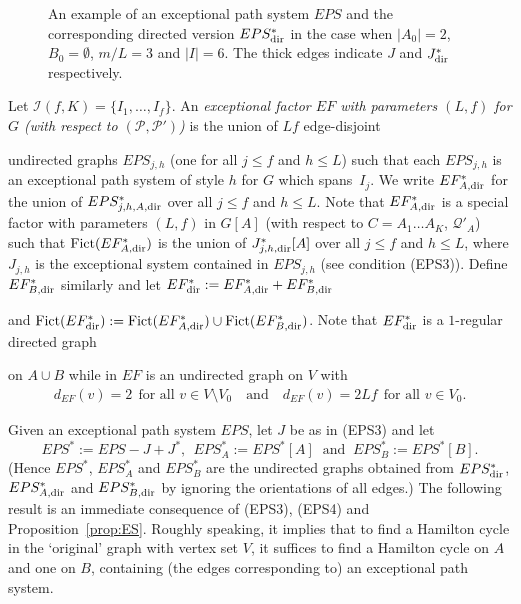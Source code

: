 \documentclass{memo-l}
\def\COMMENT#1{}
\numberwithin{section}{chapter}
\numberwithin{equation}{section}
\numberwithin{firstthm}{section}
\numberwithin{figure}{section}
\begin{document}
\begin{figure}
{
}
\caption{An example of an exceptional path system $EPS$ and the corresponding directed version $EPS^*_{\rm dir}$ in the
case when $|A_0|=2$, $B_0=\emptyset$, $m/L=3$ and $|I|=6$. The thick edges indicate $J$ and $J^*_{\rm dir}$ respectively.}
\label{fig:eps}
\end{figure}

Let $\mathcal{I}(f,K)=\{I_1,\dots,I_f\}$.
An \emph{exceptional factor $EF$ with parameters $(L,f)$ for $G$ (with respect to $(\mathcal{P},\mathcal{P'})$)} is 
the union of $Lf$ edge-disjoint%
    \COMMENT{Daniela: added edge-disjoint, otherwise the $EPS_{j,h}$ could use the same edges inside $A_0\cup B_0$ and
then (\ref{EFdeg}) may not hold}
undirected graphs $EPS_{j,h}$ (one for all $j\le f$ and $h\le L$) such that each $EPS_{j,h}$ is
an exceptional path system of style $h$ for $G$ which spans~$I_j$.
We write $EF^*_{A,\rm dir}$ for the union of $EPS_{j,h,A,{\rm dir}}^*$ over all
$j\le f$ and $h\le L$.
Note that $EF^*_{A,{\rm dir}}$ is a special factor with parameters $(L,f)$ in $G[A]$ (with respect to $C=A_1 \dots A_K$, $\mathcal{Q}'_A$)
such that ${\rm Fict}(EF^*_{A,{\rm dir}})$ is the union of $J^*_{j,h,{\rm dir}}[A]$ over all $j\le f$ and $h\le L$, where $J_{j,h}$ is the exceptional
system contained in $EPS_{j,h}$ (see condition (EPS3)). 
Define $EF^*_{B,{\rm dir}}$ similarly and let $EF^*_{{\rm dir}} : = EF^*_{A,{\rm dir}} + EF^*_{B,{\rm dir}} $%
   \COMMENT{Daniela: $+$ instead of $\cup$ since we have $+$ for $EPS^*_{{\rm dir}}$}
and ${\rm Fict}(EF^*_{\rm dir}):={\rm Fict}(EF^*_{A,{\rm dir}}) \cup {\rm Fict}(EF^*_{B,{\rm dir}})$.
Note that $EF^*_{{\rm dir}}$ is a $1$-regular directed graph
    \COMMENT{Daniela: had multigraph before, but I don't see why we could get multiple edges}
on $A \cup B$ while in $EF$ is an undirected graph on $V$ with 
\begin{align}\label{EFdeg}
	d_{EF}(v) = 2 \ \ \text{for all } v \in V \setminus V_0 \ \ \ \text{ and } \ \ \ d_{EF}(v) = 2Lf \ \ \text{for all } v \in V_0.	
\end{align}

Given an exceptional path system $EPS$, let $J$ be as in (EPS3) and
let 
$$
EPS^*:=EPS-J+J^*,\ \ EPS^*_A:=EPS^*[A] \ \mbox{ and }  \ EPS^*_B:=EPS^*[B].
$$ 
(Hence $EPS^*$, $EPS^*_A$ and $EPS^*_B$ are the undirected graphs obtained
from $EPS^*_{\rm dir}$, $EPS^*_{A,\rm dir}$ and $EPS^*_{B,\rm dir}$ by ignoring the orientations of all edges.)
The following result is an immediate consequence of (EPS3), (EPS4) and Proposition~\ref{prop:ES}.
Roughly speaking, it implies that to find a Hamilton cycle in the `original' graph with vertex set $V$, 
it suffices to find a Hamilton cycle on $A$ and one on $B$, containing (the edges corresponding to) an exceptional path system.
\end{document}
